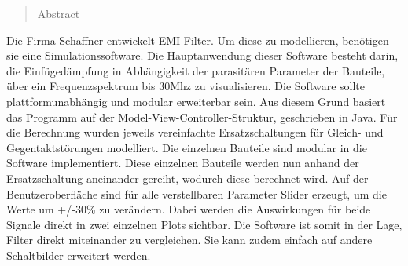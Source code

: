 \documentclass[final]{fhnwreport}       %
\begin{document}
\begin{abstract}
Abstract

\end{abstract}
Die Firma Schaffner entwickelt EMI-Filter. Um diese zu modellieren, benötigen sie eine Simulationssoftware. Die Hauptanwendung dieser Software besteht darin, die Einfügedämpfung in Abhängigkeit der parasitären Parameter der Bauteile,  über ein Frequenzspektrum bis 30Mhz zu visualisieren. Die Software sollte plattformunabhängig und modular erweiterbar sein. Aus diesem Grund basiert  das Programm auf der Model-View-Controller-Struktur, geschrieben in Java. Für die Berechnung wurden jeweils vereinfachte Ersatzschaltungen für Gleich- und Gegentaktstörungen modelliert. Die einzelnen Bauteile sind modular in die Software implementiert. Diese einzelnen Bauteile werden nun anhand der Ersatzschaltung aneinander gereiht, wodurch diese berechnet wird. Auf der Benutzeroberfläche sind für alle verstellbaren Parameter Slider erzeugt, um die Werte um +/-30\% zu verändern. Dabei werden die Auswirkungen für beide Signale direkt in zwei einzelnen Plots sichtbar. Die Software ist somit in der Lage, Filter direkt miteinander zu vergleichen. Sie kann zudem einfach auf andere Schaltbilder erweitert werden. 
\thispagestyle{empty}


\tableofcontents
\clearpage










{\sloppypar
{}	
\setlength{\bibitemsep}{\baselineskip}
\printbibliography[heading=bibintoc]
\label{sec:lit}
}




{%
}
\end{document}
